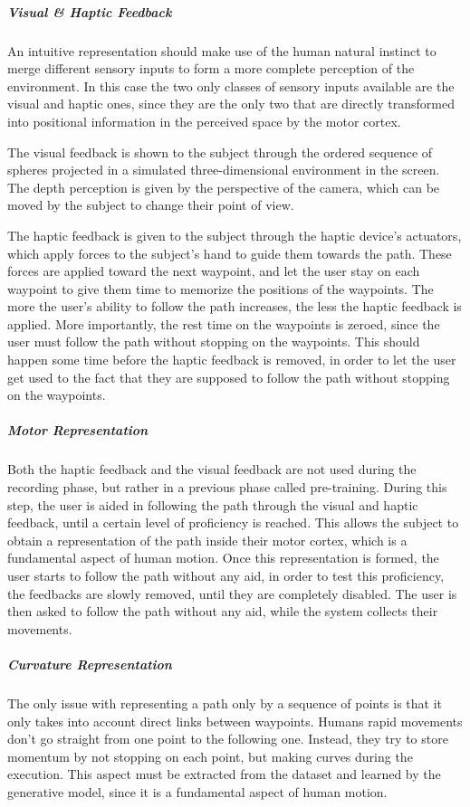 \documentclass[12pt]{report}
\begin{document}
\subparagraph{Visual \& Haptic Feedback} An intuitive representation should make use of the human natural instinct to merge different sensory inputs to form a more complete perception of the environment. In this case the two only classes of sensory inputs available are the visual and haptic ones, since they are the only two that are directly transformed into positional information in the perceived space by the motor cortex. 

The visual feedback is shown to the subject through the ordered sequence of spheres projected in a simulated three-dimensional environment in the screen. The depth perception is given by the perspective of the camera, which can be moved by the subject to change their point of view. 

The haptic feedback is given to the subject through the haptic device's actuators, which apply forces to the subject's hand to guide them towards the path. These forces are applied toward the next waypoint, and let the user stay on each waypoint to give them time to memorize the positions of the waypoints. The more the user's ability to follow the path increases, the less the haptic feedback is applied. More importantly, the rest time on the waypoints is zeroed, since the user must follow the path without stopping on the waypoints. This should happen some time before the haptic feedback is removed, in order to let the user get used to the fact that they are supposed to follow the path without stopping on the waypoints.

\subparagraph{Motor Representation} Both the haptic feedback and the visual feedback are not used during the recording phase, but rather in a previous phase called pre-training. During this step, the user is aided in following the path through the visual and haptic feedback, until a certain level of proficiency is reached. This allows the subject to obtain a representation of the path inside their motor cortex, which is a fundamental aspect of human motion. Once this representation is formed, the user starts to follow the path without any aid, in order to test this proficiency, the feedbacks are slowly removed, until they are completely disabled. The user is then asked to follow the path without any aid, while the system collects their movements. 

\subparagraph{Curvature Representation}
The only issue with representing a path only by a sequence of points is that it only takes into account direct links between waypoints. Humans rapid movements don't go straight from one point to the following one. Instead, they try to store momentum by not stopping on each point, but making curves during the execution. This aspect must be extracted from the dataset and learned by the generative model, since it is a fundamental aspect of human motion.
\end{document}
